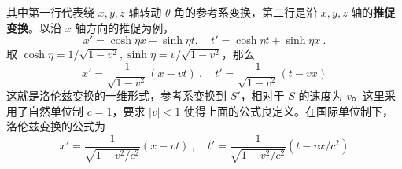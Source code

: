 其中第一行代表绕 $x,y,z$ 轴转动 $\theta$ 角的参考系变换，第二行是沿 $x,y,z$ 轴的\textbf{推促变换}。以沿 $x$ 轴方向的推促为例，
\begin{equation}
x'=\cosh\eta x + \sinh\eta t,\quad t'=\cosh\eta t+\sinh\eta x~.
\end{equation}
取 $\cosh\eta = 1/\sqrt{1-v^2},\sinh\eta = v/\sqrt{1-v^2}$，那么
\begin{equation}
x'=\frac{1}{\sqrt{1-v^2}}(x-v t)~,\quad t'=\frac{1}{\sqrt{1-v^2}}(t-vx)
\end{equation}
这就是洛伦兹变换的一维形式，参考系变换到 $S'$，相对于 $S$ 的速度为 $v$。这里采用了自然单位制 $c=1$，要求 $|v|< 1$ 使得上面的公式良定义。在国际单位制下，洛伦兹变换的公式为
\begin{equation}
x'=\frac{1}{\sqrt{1-v^2/c^2}}(x-v t)~,\quad t'=\frac{1}{\sqrt{1-v^2/c^2}}(t-vx/c^2)
\end{equation}